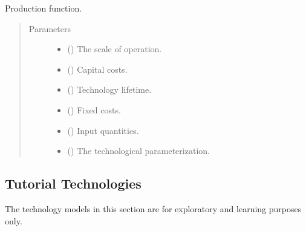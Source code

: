 \documentclass[letterpaper,10pt,english]{sphinxmanual}
\begin{document}
\begin{fulllineitems}
\label{\detokenize{technology:technology.transport_model.production}}
Production function.
\begin{quote}\begin{description}
\item[{Parameters}] \leavevmode\begin{itemize}
\item {} 
 () \textendash{} The scale of operation.

\item {} 
 () \textendash{} Capital costs.

\item {} 
 () \textendash{} Technology lifetime.

\item {} 
 () \textendash{} Fixed costs.

\item {} 
 () \textendash{} Input quantities.

\item {} 
 () \textendash{} The technological parameterization.

\end{itemize}

\end{description}\end{quote}

\end{fulllineitems}



\subsection{Tutorial Technologies}
\label{\detokenize{technology:tutorial-technologies}}
The technology models in this section are for exploratory and learning purposes only.
\end{document}
